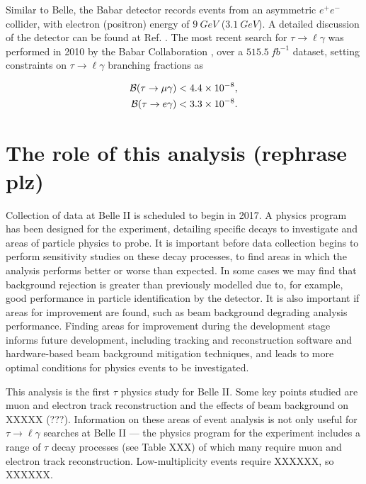 \documentclass[12pt]{thesis}  %
\newcommand{\br}{\mathcal{B}}
\newcommand{\tmg}{\tau\to\mu\gamma}
\newcommand{\tlg}{\tau\to\ell\gamma}
\begin{document}
Similar to Belle, the Babar detector records events from an asymmetric $e^+e^-$ collider, with electron (positron) energy of $\SI{9}{GeV}$ ($\SI{3.1}{GeV}$). A detailed discussion of the detector can be found at Ref. \cite{Babar:2002}. The most recent search for $\tlg$ was performed in 2010 by the Babar Collaboration \cite{Babar:2010}, over a $\SI{515.5}{fb^{-1}}$ dataset, setting constraints on $\tlg$ branching fractions as

\begin{align*}
\br(\tmg)&<\num{4.4d-8},\\
\br(\tau\to e \gamma)&<\num{3.3d-8}.
\end{align*}


\section{The role of this analysis (rephrase plz)}

Collection of data at Belle II is scheduled to begin in 2017. A physics program has been designed for the experiment, detailing specific decays to investigate and areas of particle physics to probe. It is important before data collection begins to perform sensitivity studies on these decay processes, to find areas in which the analysis performs better or worse than expected. In some cases we may find that background rejection is greater than previously modelled due to, for example, good performance in particle identification by the detector. It is also important if areas for improvement are found, such as beam background degrading analysis performance. Finding areas for improvement during the development stage informs future development, including tracking and reconstruction software and hardware-based beam background mitigation techniques, and leads to more optimal conditions for physics events to be investigated.


This analysis is the first $\tau$ physics study for Belle II. Some key points studied are muon and electron track reconstruction and the effects of beam background on XXXXX (???). Information on these areas of event analysis is not only useful for $\tau\to\ell\gamma$ searches at Belle II --- the physics program for the experiment includes a range of $\tau$ decay processes (see Table XXX) of which many require muon and electron track reconstruction. Low-multiplicity events require XXXXXX, so XXXXXX.
\end{document}
